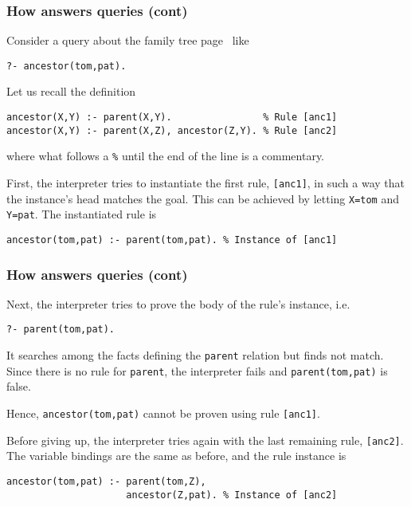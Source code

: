 %
\begin{frame}[containsverbatim]
\frametitle{How \Prolog answers queries (cont)}

Consider a query about the family tree page~\pageref{family_tree} like
{\small
\begin{verbatim}
?- ancestor(tom,pat).
\end{verbatim}
}
Let us recall the definition
{\small
\begin{verbatim}
ancestor(X,Y) :- parent(X,Y).                % Rule [anc1]
ancestor(X,Y) :- parent(X,Z), ancestor(Z,Y). % Rule [anc2]
\end{verbatim}
} 
where what follows a \texttt{\%} until the end of the line is a commentary.

\bigskip

First, the interpreter tries to instantiate the first rule,
\texttt{[anc1]}, in such a way that the instance's head matches the
goal. This can be achieved by letting \texttt{X=tom} and
\texttt{Y=pat}. The instantiated rule is {\small
\begin{verbatim}
ancestor(tom,pat) :- parent(tom,pat). % Instance of [anc1]
\end{verbatim}
}

\end{frame}

%
\begin{frame}[containsverbatim]
\frametitle{How \Prolog answers queries (cont)}

Next, the interpreter tries to prove the body of the rule's instance,
i.e.
{\small
\begin{verbatim}
?- parent(tom,pat).
\end{verbatim}
}
It searches among the facts defining the \texttt{parent} relation but
finds not match. Since there is no rule for \texttt{parent}, the
interpreter fails and \texttt{parent(tom,pat)} is false.

\bigskip

Hence, \texttt{ancestor(tom,pat)} cannot be proven using rule
\texttt{[anc1]}. 

\bigskip

Before giving up, the interpreter tries again with the last remaining
rule, \texttt{[anc2]}. The variable bindings are the same as before,
and the rule instance is 
{\small
\begin{verbatim}
ancestor(tom,pat) :- parent(tom,Z),
                     ancestor(Z,pat). % Instance of [anc2]
\end{verbatim}
}

\end{frame}

